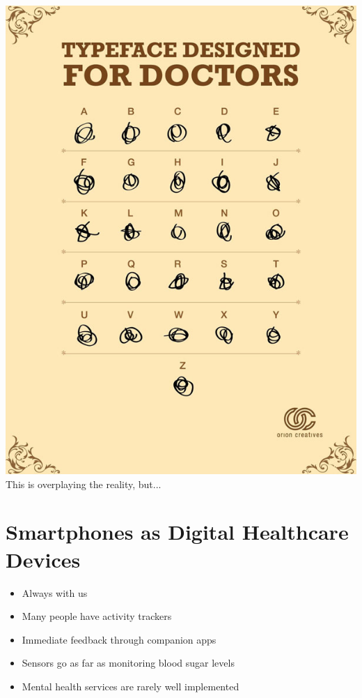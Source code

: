 \documentclass[xcolor=dvipsnames, aspectratio=1610]{beamer}
\begin{document}
\begin{frame}{\secname}
    \centering
    \includegraphics[height=0.8\textheight]{../media/doctor_handwriting.jpg} \\
    \small{This is overplaying the reality, but... \cite{docHandwriting}}
\end{frame}


\section{Smartphones as Digital Healthcare Devices}%
\label{sec:smartphones_as_digital_healthcare_devices}

\begin{frame}{\secname}
    \begin{itemize}[<+->]
        \item Always with us
        \item Many people have activity trackers
        \item Immediate feedback through companion apps
        \item Sensors go as far as monitoring blood sugar levels \cite{glucoseTracker}
        \item Mental health services are rarely well implemented \cite{torous2017needed}
    \end{itemize}
\end{frame}
\end{document}
